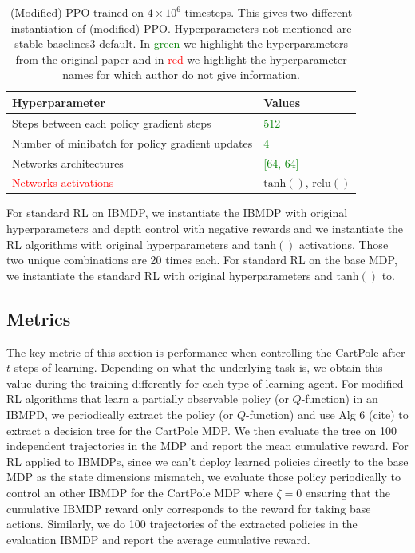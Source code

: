 \begin{table}[h]
    \centering
    \caption{(Modified) PPO trained on $4\times10^6$ timesteps. This gives two different instantiation of (modified) PPO. Hyperparameters not mentioned are stable-baselines3 default. In \textcolor{green}{green} we highlight the hyperparameters from the original paper and in \textcolor{red}{red} we highlight the hyperparameter names for which author do not give information.}
    \begin{tabular}{ll}
    \toprule
    \textbf{Hyperparameter} & \textbf{Values}\\
    \midrule
    Steps between each policy gradient steps & \textcolor{green}{512} \\
    Number of minibatch for policy gradient updates & \textcolor{green}{4} \\
    Networks architectures & \textcolor{green}{[64, 64]}\\
    \textcolor{red}{Networks activations} & $\operatorname{tanh()}$, $\operatorname{relu()}$\\
    \bottomrule
    \end{tabular}
    \end{table}


For standard RL on IBMDP, we instantiate the IBMDP with original hyperparameters and depth control with negative rewards and we instantiate the RL algorithms with original hyperparameters and $\operatorname{tanh()}$ activations. Those two unique combinations are 20 times each.
For standard RL on the base MDP, we instantiate the standard RL with original hyperparameters and $\operatorname{tanh()}$ to.
    

\subsection{Metrics}
The key metric of this section is performance when controlling the CartPole after $t$ steps of learning.
Depending on what the underlying task is, we obtain this value during the training differently for each type of learning agent.
For modified RL algorithms that learn a partially observable policy (or $Q$-function) in an IBMPD, we periodically extract the policy (or $Q$-function) and use Alg 6 (cite) to extract a decision tree for the CartPole MDP. 
We then evaluate the tree on 100 independent trajectories in the MDP and report the mean cumulative reward.
For RL applied to IBMDPs, since we can't deploy learned policies directly to the base MDP as the state dimensions mismatch, we evaluate those policy periodically to control an other IBMDP for the CartPole MDP where $\zeta=0$ ensuring that the cumulative IBMDP reward only corresponds to the reward for taking base actions.
Similarly, we do 100 trajectories of the extracted policies in the evaluation IBMDP and report the average cumulative reward.

